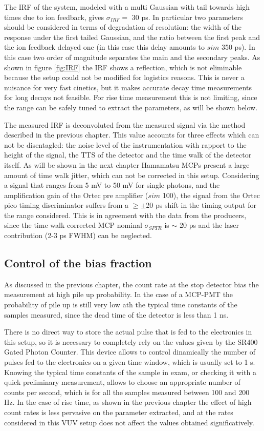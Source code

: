 The IRF of the system, modeled with a multi Gaussian with tail towards high times due to ion feedback, gives $\sigma _{IRF} = $ 30 ps.
In particular two parameters should be considered in terms of degradation of resolution: the width of the response under the first tailed Gaussian, and the ratio between the first peak and the ion feedback delayed one (in this case this delay amounts to $sim$ 350 ps). In this case two order of magnitude separates the main and the secondary peaks.
As shown in figure \ref{fig:IRF} the IRF shows a reflection, which is not eliminable because the setup could not be modified for logistics reasons. This is never a nuisance for very fast cinetics, but it makes accurate decay time measurements for long decays not feasible. For rise time measurement this is not limiting, since the range can be safely tuned to extract the parameters, as will be shown below. 

The measured IRF is deconvoluted from the measured signal via the method described in the previous chapter.
This value accounts for three effects which can not be disentagled: the noise level of the instrumentation with rapport to the height of the signal, the TTS of the detector and the time walk of the detector itself.
As will be shown in the next chapter Hamamatsu MCPs present a large amount of time walk jitter, which can not be corrected in this setup. Considering a signal that ranges from 5 mV to 50 mV for single photons, and the amplification gain of the Ortec pre amplifier ($sim$ 100), the signal from the Ortec pico timing discriminator suffers from a $\geq\pm$20 ps shift in the timing output for the range considered.
This is in agreement with the data from the producers, since the time walk corrected MCP nominal $\sigma _{SPTR}$ is $\sim$ 20 ps and the laser contribution (2-3 ps FWHM) can be neglected.

\subsection{Control of the bias fraction}

As discussed in the previous chapter, the count rate at the stop detector bias the measurement at high pile up probability. In the case of a MCP-PMT the probability of pile up is still very low ath the typical time constants of the samples measured, since the dead time of the detector is less than 1 ns. 

There is no direct way to store the actual pulse that is fed to the electronics in this setup, so it is necessary to completely rely on the values given by the SR400 Gated Photon Counter. 
This device allows to control dinamically the number of pulses fed to the electronics on a given time window, which is usually set to 1 s. Knowing the typical time constants of the sample in exam, or checking it with a quick preliminary measurement, allows to choose an appropriate number of counts per second, which is for all the samples measured between 100 and 200 Hz.
In the case of rise time, as shown in the previous chapter the effect of high count rates is less pervasive on the parameter extracted, and at the rates considered in this VUV setup does not affect the values obtained significatively.

